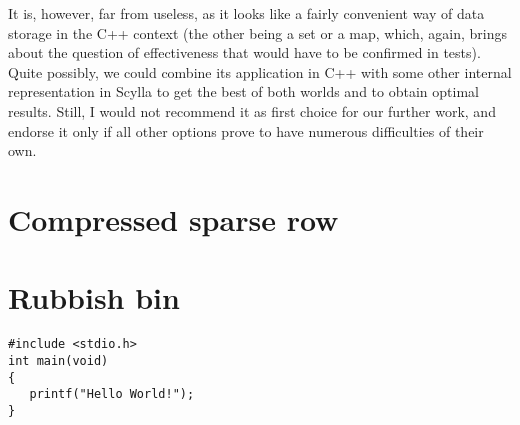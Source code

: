 \documentclass{article}
\begin{document}
It is, however, far from useless, as it looks like a fairly convenient way of data storage in the C++ context (the other being a set or a map, which, again, brings about the question of effectiveness that would have to be confirmed in tests). Quite possibly, we could combine its application in C++ with some other internal representation in Scylla to get the best of both worlds and to obtain optimal results. Still, I would not recommend it as first choice for our further work, and endorse it only if all other options prove to have numerous difficulties of their own.

\pagebreak
\section{Compressed sparse row}

\pagebreak
\section*{Rubbish bin}

\begin{lstlisting}[style=CStyle]
#include <stdio.h>
int main(void)
{
   printf("Hello World!"); 
}
\end{lstlisting}
\end{document}
